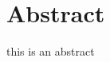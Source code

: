 \documentclass[../thesis.tex]{subfiles} %
\begin{document}
\section{Abstract}
this is an abstract
\end{document}
